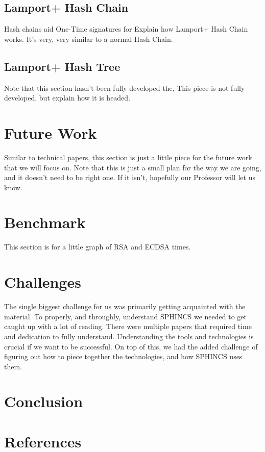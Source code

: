 \documentclass[]{scrartcl}
\begin{document}
\subsection*{Lamport+ Hash Chain}
Hash chains aid One-Time signatures for 
Explain how Lamport+ Hash Chain works. It's very, very similar to a normal Hash Chain.

\subsection*{Lamport+ Hash Tree}
Note that this section hasn't been fully developed the,
This piece is not fully developed, but explain how it is headed.

\section*{Future Work}
Similar to technical papers, this section is just a little piece for the future work that we will focus on. Note that this is just a small plan for the way we are going, and it doesn't need to be right one. If it isn't, hopefully our Professor will let us know.

\section*{Benchmark}
This section is for a little graph of RSA and ECDSA times.

\section*{Challenges}
The single biggest challenge for us was primarily getting acquainted with the material. To properly, and throughly, understand SPHINCS we needed to get caught up with a lot of reading. There were multiple papers that required time and dedication to fully understand. Understanding the tools and technologies is crucial if we want to be successful. On top of this, we had the added challenge of figuring out how to piece together the technologies, and how SPHINCS uses them.

\section*{Conclusion}

\section*{References}
\end{document}
